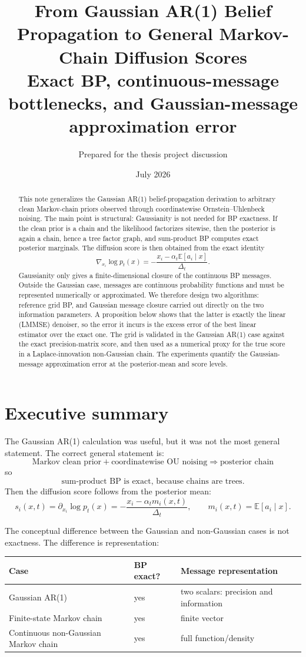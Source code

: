 \documentclass[11pt]{article}
\title{From Gaussian AR(1) Belief Propagation to General Markov-Chain Diffusion Scores\\
\large Exact BP, continuous-message bottlenecks, and Gaussian-message approximation error}
\author{Prepared for the thesis project discussion}
\date{July 2026}
\newcommand{\E}{\mathbb{E}}
\begin{document}
\maketitle

\begin{abstract}
This note generalizes the Gaussian AR(1) belief-propagation derivation to arbitrary clean Markov-chain priors observed through coordinatewise Ornstein--Uhlenbeck noising. The main point is structural: Gaussianity is not needed for BP exactness. If the clean prior is a chain and the likelihood factorizes sitewise, then the posterior is again a chain, hence a tree factor graph, and sum-product BP computes exact posterior marginals. The diffusion score is then obtained from the exact identity
\[
  \nabla_{x_i}\log p_t(x) = -\frac{x_i-\alpha_t\E[a_i\mid x]}{\Delta_t}.
\]
Gaussianity only gives a finite-dimensional closure of the continuous BP messages. Outside the Gaussian case, messages are continuous probability functions and must be represented numerically or approximated. We therefore design two algorithms: reference grid BP, and Gaussian message closure carried out directly on the two information parameters. A proposition below shows that the latter is exactly the linear (LMMSE) denoiser, so the error it incurs is the excess error of the best linear estimator over the exact one. The grid is validated in the Gaussian AR(1) case against the exact precision-matrix score, and then used as a numerical proxy for the true score in a Laplace-innovation non-Gaussian chain. The experiments quantify the Gaussian-message approximation error at the posterior-mean and score levels.
\end{abstract}

\tableofcontents
\newpage

\section{Executive summary}

The Gaussian AR(1) calculation was useful, but it was not the most general statement. The correct general statement is:
\[
\boxed{\text{Markov clean prior} + \text{coordinatewise OU noising}
\Rightarrow \text{posterior chain}}
\]
so
\[
\boxed{\text{sum-product BP is exact, because chains are trees}.}
\]
Then the diffusion score follows from the posterior mean:
\[
\boxed{
  s_i(x,t) = \partial_{x_i}\log p_t(x)
  = -\frac{x_i-\alpha_t m_i(x,t)}{\Delta_t},
  \qquad m_i(x,t)=\E[a_i\mid x].
}
\]

The conceptual difference between the Gaussian and non-Gaussian cases is not exactness. The difference is representation:
\begin{center}
\begin{tabular}{lll}
\toprule
Case & BP exact? & Message representation \\
\midrule
Gaussian AR(1) & yes & two scalars: precision and information \\
Finite-state Markov chain & yes & finite vector \\
Continuous non-Gaussian Markov chain & yes & full function/density \\
\bottomrule
\end{tabular}
\end{center}
\end{document}
